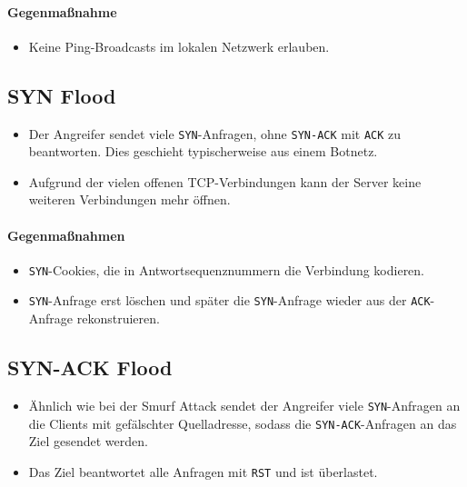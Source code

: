 \documentclass[a4paper, 11pt, accentcolor = tud3b]{tudreport}
\begin{document}
		        \paragraph{Gegenmaßnahme}
			        \begin{itemize}
			        	\item Keine Ping-Broadcasts im lokalen Netzwerk erlauben.
			        \end{itemize}
	
	        \subsection{SYN Flood}
	            \begin{itemize}
	            	\item Der Angreifer sendet viele \texttt{SYN}-Anfragen, ohne \texttt{SYN-ACK} mit \texttt{ACK} zu beantworten. Dies geschieht typischerweise aus einem Botnetz.
	            	\item Aufgrund der vielen offenen TCP-Verbindungen kann der Server keine weiteren Verbindungen mehr öffnen.
	            \end{itemize}
	        
		        \paragraph{Gegenmaßnahmen}
			        \begin{itemize}
			        	\item \texttt{SYN}-Cookies, die in Antwortsequenznummern die Verbindung kodieren.
			        	\item \texttt{SYN}-Anfrage erst löschen und später die \texttt{SYN}-Anfrage wieder aus der \texttt{ACK}-Anfrage rekonstruieren.
			        \end{itemize}
	
	        \subsection{SYN-ACK Flood}
	            \begin{itemize}
	            	\item Ähnlich wie bei der Smurf Attack sendet der Angreifer viele \texttt{SYN}-Anfragen an die Clients mit gefälschter Quelladresse, sodass die \texttt{SYN-ACK}-Anfragen an das Ziel gesendet werden.
	            	\item Das Ziel beantwortet alle Anfragen mit \texttt{RST} und ist überlastet.
	            \end{itemize}
	        
\end{document}
